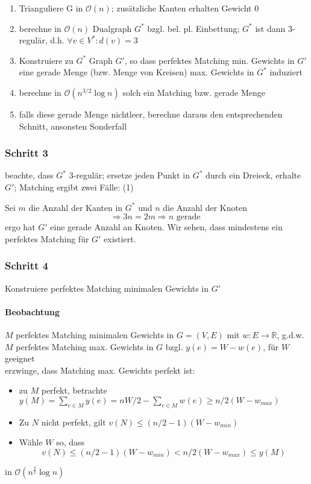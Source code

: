 \documentclass{article}
\renewcommand{\O}[1]{\mathcal{O}\left(#1\right)}
\newcommand{\R}{\mathbb{R}}
\begin{document}
\begin{enumerate}
	\item Trianguliere G in $\O{n}$; zusätzliche Kanten erhalten Gewicht 0
	\item berechne in $\O{n}$ Dualgraph $G^*$ bzgl. bel. pl. Einbettung; $G^*$ ist dann 3-regulär, d.h. $\forall v \in V^*: d(v) = 3$
	\item Konstruiere zu $G^*$ Graph $G'$, so dass perfektes Matching min. Gewichts in $G'$ eine gerade Menge (bzw. Menge von Kreisen) max. Gewichts in $G^*$ induziert
	\item berechne in $\O{n^{3/2}\log n}$ solch ein Matching bzw. gerade Menge
	\item falls diese gerade Menge nichtleer, berechne daraus den entsprechenden Schnitt, ansonsten Sonderfall
\end{enumerate}

\subsubsection{Schritt 3}
beachte, dass $G^*$ 3-regulär; ersetze jeden Punkt in $G^*$ durch ein Dreieck, erhalte $G'$; Matching ergibt zwei Fälle:
(1)

Sei $m$ die Anzahl der Kanten in $G^*$ und $n$ die Anzahl der Knoten
\[\Rightarrow 3n = 2m \Rightarrow n \text{ gerade }\]
ergo hat $G'$ eine gerade Anzahl an Knoten. Wir sehen, dass mindestens ein perfektes Matching für $G'$ existiert.

\subsubsection{Schritt 4}
Konstruiere perfektes Matching minimalen Gewichts in $G'$
\paragraph{Beobachtung}
$M$ perfektes Matching minimalen Gewichts in $G = (V,E)$ mit $w:E\rightarrow \R$, g.d.w. $M$ perfektes Matching max. Gewichts in $G$ bzgl. $y(e) = W - w(e)$, für $W$ geeignet\\
erzwinge, dass Matching max. Gewichts perfekt ist:
\begin{itemize}
	\item zu $M$ perfekt, betrachte $y(M) = \sum_{e\in M}y(e) = nW/2 - \sum_{e \in M}w(e) \geq n/2 (W- w_{max})$
	\item Zu $N$ nicht perfekt, gilt $v(N) \leq (n/2 - 1)(W - w_{min})$
	\item Wähle $W$ so, dass
	\[v(N) \leq (n/2 - 1)(W - w_{min}) < n/2 (W- w_{max}) \leq y(M)\]
\end{itemize}
in $\O{n^\frac{3}{2}\log n}$
\end{document}
